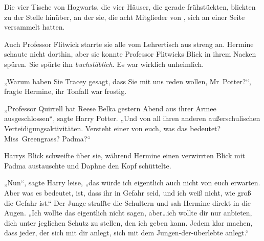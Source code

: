Die vier Tische von Hogwarts, die vier Häuser, die gerade frühstückten, blickten zu der Stelle hinüber, an der sie, die acht Mitglieder von \SPHEW, sich an einer Seite versammelt hatten.

Auch Professor Flitwick starrte sie alle vom Lehrertisch aus streng an. Hermine schaute nicht dorthin, aber sie konnte Professor Flitwicks Blick in ihrem Nacken spüren. Sie spürte ihn \emph{buchstäblich}. Es war wirklich unheimlich.

„Warum haben Sie Tracey gesagt, dass Sie mit uns reden wollen, Mr~Potter?“, fragte Hermine, ihr Tonfall war frostig.

„Professor Quirrell hat Reese Belka gestern Abend aus ihrer Armee ausgeschlossen“, sagte Harry Potter.
„Und von all ihren anderen außerschulischen Verteidigungsaktivitäten. Versteht einer von euch, was das bedeutet? Miss~Greengrass? Padma?“

Harrys Blick schweifte über sie, während Hermine einen verwirrten Blick mit Padma austauschte und Daphne den Kopf schüttelte.

„Nun“, sagte Harry leise, „das würde ich eigentlich auch nicht von euch erwarten. Aber was es bedeutet, ist, dass ihr in Gefahr seid, und ich weiß nicht, wie groß die Gefahr ist.“ Der Junge straffte die Schultern und sah Hermine direkt in die Augen.
„Ich wollte das eigentlich nicht sagen, aber…ich wollte dir nur anbieten, dich unter jeglichen Schutz zu stellen, den ich geben kann. Jedem klar machen, dass jeder, der sich mit dir anlegt, sich mit dem Jungen-der-überlebte anlegt.“

